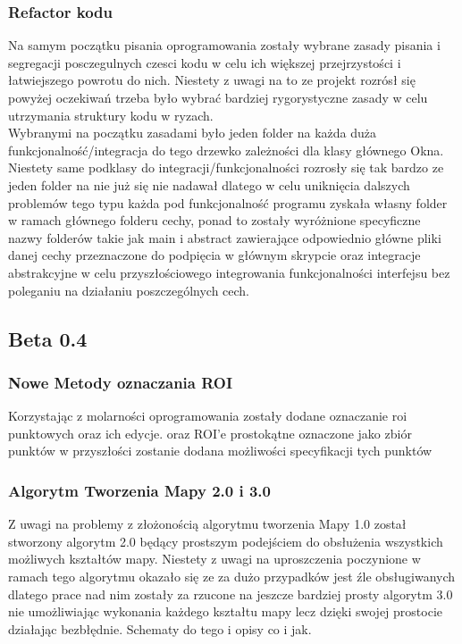 \documentclass[11pt,a4paper]{article}
\begin{document}
    \subsubsection{Refactor kodu}
    \hspace{1cm} Na samym początku pisania oprogramowania zostały wybrane zasady pisania i segregacji posczegulnych czesci kodu w celu ich większej przejrzystości i łatwiejszego powrotu do nich. Niestety z uwagi na to ze projekt rozrósł się powyżej oczekiwań trzeba było wybrać bardziej rygorystyczne zasady w celu utrzymania struktury kodu w ryzach.\\
    \hspace{1cm} Wybranymi na początku zasadami było jeden folder na każda duża funkcjonalność/integracja do tego drzewko zależności dla klasy głównego Okna. Niestety same podklasy do integracji/funkcjonalności rozrosły się tak bardzo ze jeden folder na nie już się nie nadawał dlatego w celu uniknięcia dalszych problemów tego typu każda pod funkcjonalność programu zyskała własny folder w ramach głównego folderu cechy, ponad to zostały wyróżnione specyficzne nazwy folderów takie jak main i abstract zawierające odpowiednio główne pliki danej cechy przeznaczone do podpięcia w głównym skrypcie oraz integracje abstrakcyjne w celu przyszłościowego integrowania funkcjonalności interfejsu bez poleganiu na działaniu poszczególnych cech.

    \subsection{Beta 0.4}

    \subsubsection{Nowe Metody oznaczania ROI}
    \hspace{1cm} Korzystając z molarności oprogramowania zostały dodane oznaczanie roi punktowych oraz ich edycje. oraz ROI'e prostokątne oznaczone jako zbiór punktów w przyszłości zostanie dodana możliwości specyfikacji tych punktów \\

    \subsubsection{Algorytm Tworzenia Mapy 2.0 i 3.0}
    \hspace{1cm} Z uwagi na problemy z złożonością algorytmu tworzenia Mapy 1.0 został stworzony algorytm 2.0 będący prostszym podejściem do obsłużenia wszystkich możliwych kształtów mapy. Niestety z uwagi na uproszczenia poczynione w ramach tego algorytmu okazało się ze za dużo przypadków jest źle obsługiwanych dlatego prace nad nim zostały za rzucone na jeszcze bardziej prosty algorytm 3.0 nie umożliwiając wykonania każdego kształtu mapy lecz dzięki swojej prostocie działając bezbłędnie.
            {\color{red} Schematy do tego i opisy co i jak.}
\end{document}
